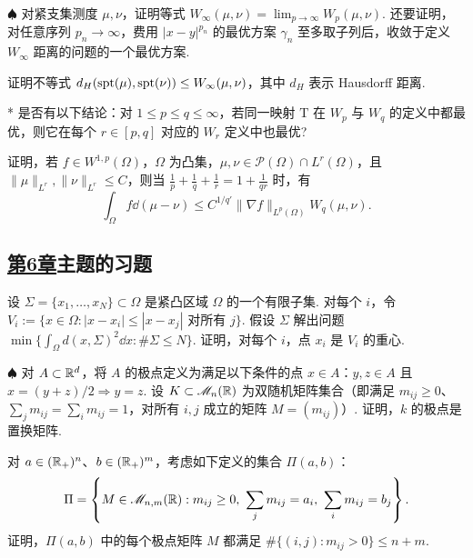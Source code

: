 \begin{exercise}\label{ex:35}
$\spadesuit$ 对紧支集测度 $\mu,\nu$，证明等式 $W_\infty(\mu,\nu)=\lim_{p\to\infty}W_p(\mu,\nu)$. 还要证明，对任意序列 $p_n\to\infty$，费用 $|x-y|^{p_n}$ 的最优方案 $\gamma_n$ 至多取子列后，收敛于定义 $W_\infty$ 距离的问题的一个最优方案.
\end{exercise}

\begin{exercise}\label{ex:36}
证明不等式 $d_H(\operatorname{spt}(\mu),\operatorname{spt}(\nu))\leq W_\infty(\mu,\nu)$，其中 $d_H$ 表示 Hausdorff 距离.
\end{exercise}

\begin{exercise}\label{ex:37}
* 是否有以下结论：对 $1\leq p\leq q\leq\infty$，若同一映射 $\mathrm T$ 在 $W_p$ 与 $W_q$ 的定义中都最优，则它在每个 $r\in[p,q]$ 对应的 $W_r$ 定义中也最优?
\end{exercise}

\begin{exercise}\label{ex:38}
证明，若 $f\in W^{1,p}(\Omega)$，$\Omega$ 为凸集，$\mu,\nu\in\mathscr P(\Omega)\cap L^r(\Omega)$，且 $\|\mu\|_{L^r},\|\nu\|_{L^r}\leq C$，则当 $\frac1p+\frac1q+\frac1r=1+\frac1{qr}$ 时，有
\[
\int_\Omega f\dd(\mu-\nu)\leq C^{1/q'}\|\nabla f\|_{L^p(\Omega)}W_q(\mu,\nu).
\]
\end{exercise}

\subsection*{\hyperref[sec:6]{第6章}主题的习题}
\begin{exercise}\label{ex:39}
设 $\Sigma=\{x_1,\ldots,x_N\}\subset\Omega$ 是紧凸区域 $\Omega$ 的一个有限子集. 对每个 $i$，令 $V_i:=\{x\in\Omega:|x-x_i|\leq|x-x_j|\text{ 对所有 }j\}$. 假设 $\Sigma$ 解出问题 $\min\{\int_\Omega d(x,\Sigma)^2\dd x:\#\Sigma\leq N\}$. 证明，对每个 $i$，点 $x_i$ 是 $V_i$ 的重心.
\end{exercise}

\begin{exercise}\label{ex:40}
$\spadesuit$ 对 $A\subset\mathbb R^d$，将 $A$ 的极点定义为满足以下条件的点 $x\in A$：$y,z\in A$ 且 $x=(y+z)/2\Longrightarrow y=z$. 设 $K\subset\mathscr M_n(\mathbb R)$ 为双随机矩阵集合（即满足 $m_{ij}\geq0$、$\sum_jm_{ij}=\sum_im_{ij}=1$，对所有 $i,j$ 成立的矩阵 $M=(m_{ij})$）. 证明，$k$ 的极点是置换矩阵.
\end{exercise}

\begin{exercise}\label{ex:41}
对 $a\in(\mathbb R_+)^n$、$b\in(\mathbb R_+)^m$，考虑如下定义的集合 $\Pi(a,b)$：
\[
\Pi=\left\{M\in\mathscr M_{n,m}(\R):m_{ij}\geq0,\ \sum_jm_{ij}=a_i,\ \sum_im_{ij}=b_j\right\}.
\]
证明，$\Pi(a,b)$ 中的每个极点矩阵 $M$ 都满足 $\#\{(i,j):m_{ij}>0\}\leq n+m$.
\end{exercise}

